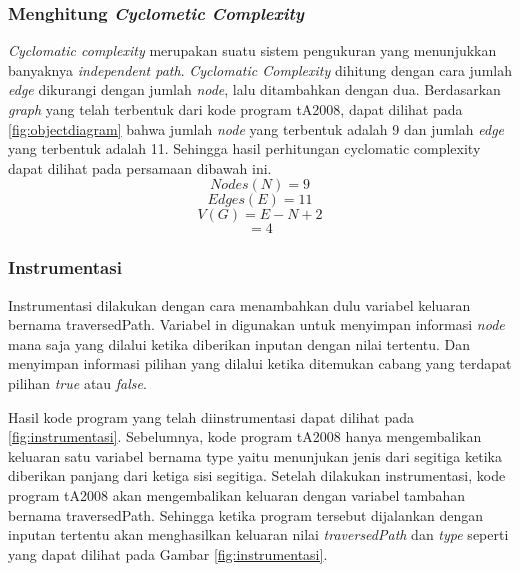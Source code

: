 \subsubsection*{Menghitung \textit{Cyclometic Complexity}}

\textit{Cyclomatic complexity} merupakan suatu sistem pengukuran yang menunjukkan banyaknya \textit{independent path}. \textit{Cyclomatic Complexity }dihitung dengan cara jumlah \textit{edge} dikurangi dengan jumlah \textit{node}, lalu ditambahkan dengan dua. Berdasarkan \textit{graph} yang telah terbentuk dari kode program tA2008, dapat dilihat pada \ref{fig:objectdiagram} bahwa jumlah \textit{node} yang terbentuk adalah 9 dan jumlah \textit{edge} yang terbentuk adalah 11. Sehingga hasil perhitungan cyclomatic complexity dapat dilihat pada persamaan dibawah ini.
\[Nodes (N) = 9\]
\[Edges (E) = 11\]
\[V(G) = E - N + 2\]
\[     = 4\]

\subsubsection*{Instrumentasi}
Instrumentasi dilakukan dengan cara menambahkan dulu variabel keluaran bernama traversedPath. Variabel in digunakan untuk menyimpan informasi \textit{node} mana saja yang dilalui ketika diberikan inputan dengan nilai tertentu. Dan menyimpan informasi pilihan yang dilalui ketika ditemukan cabang yang terdapat pilihan \textit{true} atau \textit{false}.

Hasil kode program yang telah diinstrumentasi dapat dilihat pada \ref{fig:instrumentasi}. Sebelumnya, kode program tA2008 hanya mengembalikan keluaran satu variabel bernama type yaitu menunjukan jenis dari segitiga ketika diberikan panjang dari ketiga sisi segitiga. Setelah dilakukan instrumentasi, kode program tA2008 akan mengembalikan keluaran dengan variabel tambahan bernama traversedPath.  Sehingga ketika program tersebut dijalankan dengan inputan tertentu akan menghasilkan keluaran nilai \textit{traversedPath} dan \textit{type} seperti yang dapat dilihat pada Gambar \ref{fig:instrumentasi}.

